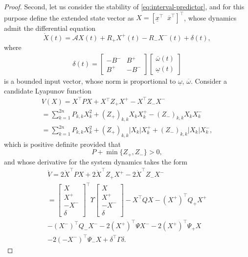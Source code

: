 \begin{proof}
	Second, let us consider the stability of \eqref{eq:interval-predictor}, and for this purpose define the extended state vector as $X=[\underline{x}^{\top}\;\;\overline{x}^{\top}]^{\top}$, whose dynamics admit the differential equation
	\[
	\dot{X}(t)=\mathcal{A}X(t)+R_{+}X^{+}(t)-R_{-}X^{-}(t)+\delta(t),
	\]
	where
	\begin{gather*}
	\delta(t)=\left[\begin{array}{cc}
	-B^{-} & B^{+}\\
	B^{+} & -B^{-}
	\end{array}\right]\left[\begin{array}{c}
	\overline{\omega}(t)\\
	\underline{\omega}(t)
	\end{array}\right]
	\end{gather*}
	is a bounded input vector, whose norm is proportional to $\underline{\omega}$,
	$\overline{\omega}$. Consider a candidate Lyapunov function
	\begin{gather*}
	V(X)=X^{\top}PX+X{}^{\top}Z_{+}X^{+}-X^{\top}Z_{-}X^{-}\\
	=\sum_{k=1}^{2n}P_{k,k}X_{k}^{2}+(Z_{+})_{k,k}X_{k}X_{k}^{+}-(Z_{-})_{k,k}X_{k}X_{k}^{-}\\
	=\sum_{k=1}^{2n}P_{k,k}X_{k}^{2}+(Z_{+})_{k,k}|X_{k}|X_{k}^{+}+(Z_{-})_{k,k}|X_{k}|X_{k}^{-},
	\end{gather*}
	which is positive definite provided that
	\[
	P+\min\{Z_{+},Z_{-}\}>0,
	\]
	and whose derivative for the system dynamics takes the form
	\begin{gather*}
	\dot{V}=2\dot{X}^{\top}PX+2\dot{X}^{\top}Z_{+}X^{+}-2\dot{X}^{\top}Z_{-}X^{-}\\
	=\left[\begin{array}{c}
	X\\
	X^{+}\\
	-X^{-}\\
	\delta
	\end{array}\right]^{\top}\Upsilon\left[\begin{array}{c}
	X\\
	X^{+}\\
	-X^{-}\\
	\delta
	\end{array}\right]-X^{\top}QX-(X^{+})^{\top}Q_{+}X^{+}\\
	-(X^{-})^{\top}Q_{-}X^{-}-2(X^{+})^{\top}\Psi X^{-}-2(X^{+})^{\top}\Psi_{+}X\\
	-2(-X^{-})^{\top}\Psi_{-}X+\delta^{\top}\Gamma\delta.
	\end{gather*}

\end{proof}
